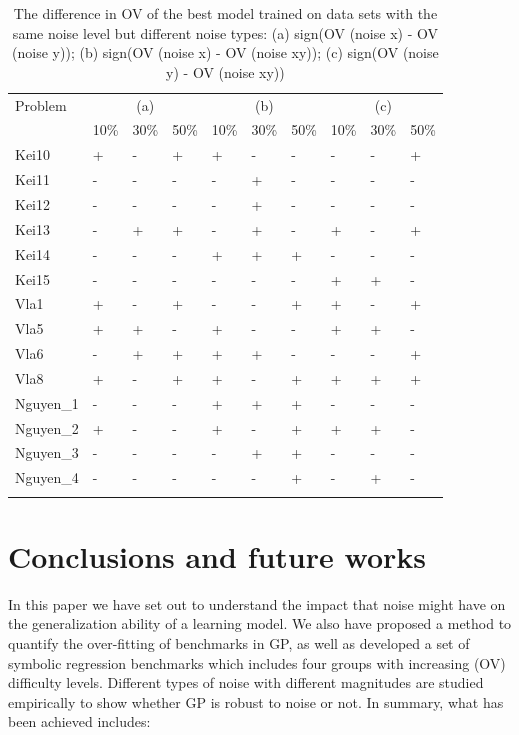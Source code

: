 \begin{table}
\caption{The difference in OV of the best model trained on data sets with the same noise level but different noise types: (a) sign(OV (noise x) - OV (noise y)); (b) sign(OV (noise x) - OV (noise xy)); (c) sign(OV (noise y) - OV (noise xy))}
\label{tab:difOV2}
\begin{tabular}{l|lll|lll|lll}
\hline\noalign{\smallskip}
Problem & \multicolumn{3}{c|}{(a)} & \multicolumn{3}{c|}{(b)} & \multicolumn{3}{c}{(c)} \\
 & 10\% & 30\% & 50\% & 10\% & 30\% & 50\% & 10\% & 30\% & 50\% \\
\noalign{\smallskip}\hline\noalign{\smallskip}
Kei10 & + & - & + & + & - & - & - & - & + \\
Kei11 & - & - & - & - & + & - & - & - & - \\
Kei12 & - & - & - & - & + & - & - & - & - \\
Kei13 & - & + & + & - & + & - & + & - & + \\
Kei14 & - & - & - & + & + & + & - & - & - \\
Kei15 & - & - & - & - & - & - & + & + & - \\
Vla1 & + & - & + & - & - & + & + & - & + \\
Vla5 & + & + & - & + & - & - & + & + & - \\
Vla6 & - & + & + & + & + & - & - & - & + \\
Vla8 & + & - & + & + & - & + & + & + & + \\
Nguyen\_1 & - & - & - & + & + & + & - & - & - \\
Nguyen\_2 & + & - & - & + & - & + & + & + & - \\
Nguyen\_3 & - & - & - & - & + & + & - & - & - \\
Nguyen\_4 & - & - & - & - & - & + & - & + & - \\


\noalign{\smallskip}\hline
\end{tabular}
\end{table}


\section {Conclusions and future works}
\label{Con}
In this paper we have set out to understand the impact that noise might have on the generalization ability of a learning model. We also have proposed a method to quantify the over-fitting of benchmarks in GP, as well as developed a set of symbolic regression benchmarks which includes four groups with increasing (OV) difficulty levels. Different types of noise with different magnitudes are studied empirically to show whether GP is robust to noise or not. In summary, what has been achieved includes:

